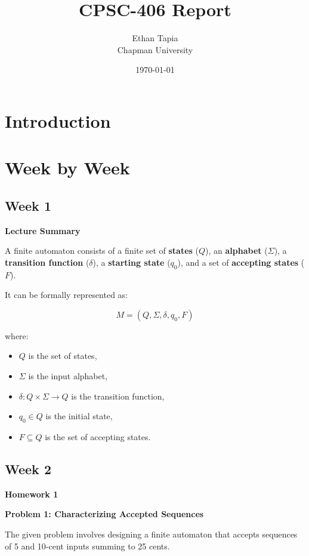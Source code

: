 \documentclass{article}
\title{CPSC-406 Report}
\author{Ethan Tapia  \\ Chapman University}
\date{\today}
\theoremstyle{theorem}
\theoremstyle{definition}
\theoremstyle{remark}
\begin{document}
\maketitle

\begin{abstract}
\end{abstract}

\setcounter{tocdepth}{3}
\tableofcontents

\section{Introduction}\label{intro}


\section{Week by Week}\label{homework}

\subsection{Week 1}
\textbf{Lecture Summary}

A finite automaton consists of a finite set of \textbf{states} ($Q$), an \textbf{alphabet} ($\Sigma$), a \textbf{transition function} ($\delta$), a \textbf{starting state} ($q_0$), and a set of \textbf{accepting states} ($F$). 

It can be formally represented as:

\[
M = (Q, \Sigma, \delta, q_0, F)
\]

where:
\begin{itemize}
    \item $Q$ is the set of states,
    \item $\Sigma$ is the input alphabet,
    \item $\delta: Q \times \Sigma \to Q$ is the transition function,
    \item $q_0 \in Q$ is the initial state,
    \item $F \subseteq Q$ is the set of accepting states.
\end{itemize}



\subsection{Week 2}
{\textbf{{Homework 1}}}

\textbf{Problem 1: Characterizing Accepted Sequences}

The given problem involves designing a finite automaton that accepts sequences of 5 and 10-cent inputs summing to 25 cents.
\end{document}
